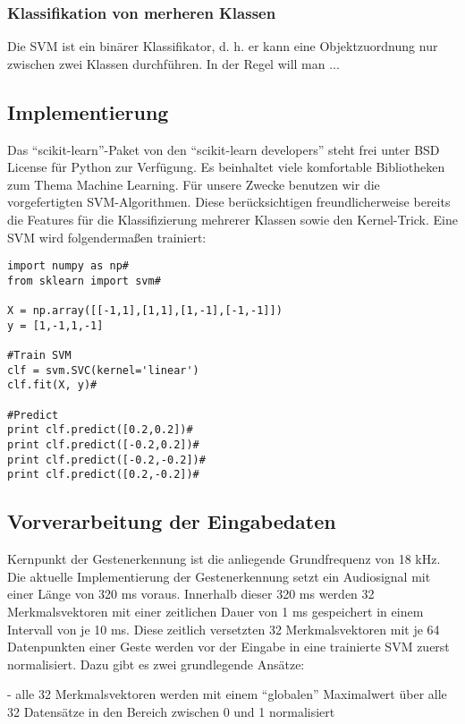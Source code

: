 \newpage

\subsubsection{Klassifikation von merheren Klassen}

Die SVM ist ein binärer Klassifikator, d. h. er kann eine Objektzuordnung nur zwischen zwei Klassen durchführen. 
In der Regel will man ...


\newpage

\subsection{Implementierung}

Das “scikit-learn”-Paket von den “scikit-learn developers” steht frei unter BSD License für Python zur Verfügung. 
Es beinhaltet viele komfortable Bibliotheken zum Thema Machine Learning. 
Für unsere Zwecke benutzen wir die vorgefertigten SVM-Algorithmen. 
Diese berücksichtigen freundlicherweise bereits die Features für die Klassifizierung mehrerer Klassen sowie den Kernel-Trick. Eine SVM wird folgendermaßen trainiert:

\begin{lstlisting}
import numpy as np#
from sklearn import svm#

X = np.array([[-1,1],[1,1],[1,-1],[-1,-1]])
y = [1,-1,1,-1]

#Train SVM
clf = svm.SVC(kernel='linear')
clf.fit(X, y)#

#Predict
print clf.predict([0.2,0.2])#
print clf.predict([-0.2,0.2])#
print clf.predict([-0.2,-0.2])#
print clf.predict([0.2,-0.2])#
\end{lstlisting}


\subsection{Vorverarbeitung der Eingabedaten}

Kernpunkt der Gestenerkennung ist die anliegende Grundfrequenz von 18 kHz. 
Die aktuelle Implementierung der Gestenerkennung setzt ein Audiosignal mit einer Länge von 320 ms voraus. 
Innerhalb dieser 320 ms werden 32 Merkmalsvektoren mit einer zeitlichen Dauer von 1 ms gespeichert in einem Intervall von je 10 ms. 
Diese zeitlich versetzten 32 Merkmalsvektoren mit je 64 Datenpunkten einer Geste werden vor der Eingabe in eine trainierte SVM zuerst normalisiert. 
Dazu gibt es zwei grundlegende Ansätze:

- alle 32 Merkmalsvektoren werden mit einem “globalen” Maximalwert über alle 32 Datensätze in den Bereich zwischen 0 und 1 normalisiert\newline

